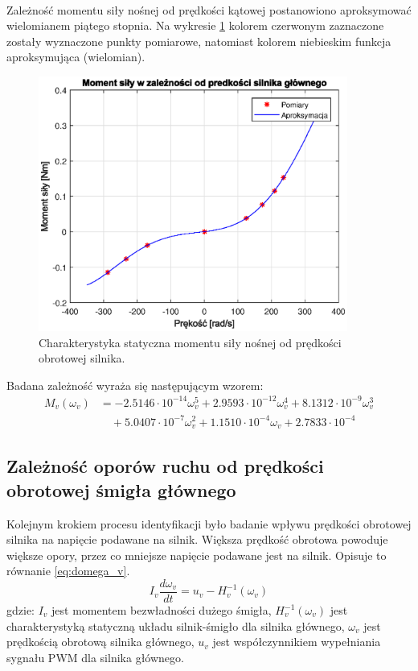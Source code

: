 \documentclass[11pt,a4paper]{article}
\begin{document}
\paragraph*{}
Zależność momentu siły nośnej od prędkości kątowej postanowiono aproksymować wielomianem piątego stopnia. Na wykresie \ref{fig:char_M_V} kolorem czerwonym zaznaczone zostały wyznaczone punkty pomiarowe, natomiast kolorem niebieskim funkcja aproksymująca (wielomian).

\begin{figure}[H]
	\centering
	\includegraphics[width=4in]{Figures/char_M_V.eps}
	\caption{Charakterystyka statyczna momentu siły nośnej od prędkości obrotowej silnika.}
	\label{fig:char_M_V}
\end{figure}

Badana zależność wyraża się następującym wzorem:
\begin{equation}
\begin{aligned}
M_v(\omega_v) &= -2.5146\cdot 10^{-14}\omega_v^5+2.9593\cdot 10^{-12}\omega_v^4+8.1312\cdot 10^{-9}\omega_v^3\\ & \quad +5.0407\cdot 10^{-7}\omega_v^2+1.1510\cdot 10^{-4}\omega_v+2.7833\cdot 10^{-4}
\end{aligned}
\end{equation}

\subsection{Zależność oporów ruchu od prędkości obrotowej śmigła głównego}
Kolejnym krokiem procesu identyfikacji było badanie wpływu prędkości obrotowej silnika na napięcie podawane na silnik. Większa prędkość obrotowa powoduje większe opory, przez co mniejsze napięcie podawane jest na silnik. Opisuje to równanie \eqref{eq:domega_v}.
\begin{equation}
I_v\frac{d\omega_v}{dt} = u_v - H_v^{-1}(\omega_v)
\label{eq:domega_v}
\end{equation}
\noindent gdzie:\newline
\(I_v\) jest momentem bezwładności dużego śmigła,\newline
\(H_v^{-1}(\omega_v)\) jest charakterystyką statyczną układu silnik-śmigło dla silnika głównego,\newline
\(\omega_v\) jest prędkością obrotową silnika głównego,\newline
\(u_v\) jest współczynnikiem wypełniania sygnału PWM dla silnika głównego.
\end{document}

